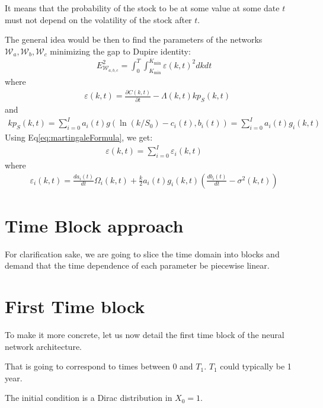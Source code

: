 \documentclass[10pt,a4paper]{article}
\begin{document}
It means that the probability of the stock to be at some value at some date $t$ must not depend on the volatility of the stock after $t$.

The general idea would be then to find the parameters of the networks $\mathcal{W}_a, \mathcal{W}_b, \mathcal{W}_c$ minimizing the gap to Dupire identity:
\begin{align}\label{eq:ErrorANN}
E^2_{\mathcal{W}_{a,b,c}} =\int_0^T\int_{K_{\mathrm{min}}}^{K_\mathrm{min}} \varepsilon(k,t)^2 dk dt
\end{align}
where
\begin{align}
&\varepsilon(k,t) = \frac{\partial C(k,t)}{\partial t} - \Lambda(k,t) k p_S(k,t)
\end{align}
and
\begin{align}
k p_S(k,t) = \sum_{i=0}^{I} a_i(t) g(\ln(k/S_0)-c_i(t), b_i(t)) = \sum_{i=0}^{I} a_i(t) g_i(k,t)
\end{align}
Using Eq\ref{eq:martingaleFormula}, we get:
\begin{align}
\varepsilon(k,t) =  \sum_{i=0}^{I}\varepsilon_i(k,t)
\end{align}
where 
\begin{align}
\varepsilon_i(k,t) = \frac{d a_i(t)}{d t} \Omega_i(k,t) + \frac{k}{2}  a_i(t) g_i(k,t) \left(\frac{d b_i(t)}{d t} - \sigma^2(k,t) \right)
\end{align}
\section{Time Block approach}
For clarification sake, we are going to slice the time domain into blocks and demand that the time dependence of each parameter be piecewise linear.

\section{First Time block}
To make it more concrete, let us now detail the first time block of the neural network architecture.

That is going to correspond to times between $0$ and $T_1$. $T_1$ could typically be 1 year.

The initial condition is a Dirac distribution in $X_0 = 1$. 
\end{document}
